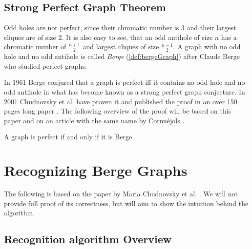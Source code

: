 \documentclass{article}
\begin{document}
\subsection{Strong Perfect Graph Theorem}

Odd holes are not perfect, since their chromatic number is 3 and their largest cliques are of size 2. It is also easy to see, that an odd antihole of size $n$ has a chromatic number of $\frac{n+1}{2}$ and largest cliques of size $\frac{n-1}{2}$. A graph with no odd hole and no odd antihole is called \emph{Berge} (\cref{def:bergeGraph}) after Claude Berge who studied perfect graphs.

In 1961 Berge conjured that a graph is perfect iff it contains no odd hole and no odd antihole in what has become known as a strong perfect graph conjecture. In 2001 Chudnovsky et al. have proven it and published the proof in an over 150 pages long paper  \cite{MC06}. The following overview of the proof will be based on this paper and on an article with the same name by Cornuéjols \cite{GC03}.

\begin{theorem}
	A graph is perfect if and only if it is Berge.
\end{theorem}



\section{Recognizing Berge Graphs}

The following is based on the paper by Maria Chudnovsky et al. . We will not provide full proof of its correctness, but will aim to show the intuition behind the algorithm.

\subsection{Recognition algorithm Overview}
\end{document}
